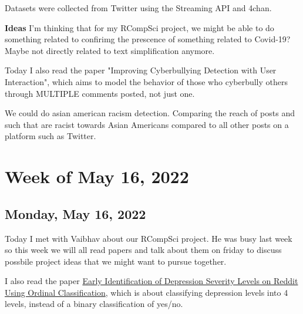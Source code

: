 \documentclass[11pt,letterpaper]{article}
\begin{document}
Datasets were collected from Twitter using the Streaming API and 4chan.

\textbf{Ideas}
I'm thinking that for my RCompSci project, we might be able to do something related to confirimg the prescence of something related to Covid-19? Maybe not directly related to text simplification anymore.

Today I also read the paper "Improving Cyberbullying Detection with User Interaction", which aims to model the behavior of those who cyberbully others through MULTIPLE comments posted, not just one.

We could do asian american racism detection. Comparing the reach of posts and such that are racist towards Asian Americans compared to all other posts on a platform such as Twitter.


\section{Week of May 16, 2022}
\subsection{Monday, May 16, 2022}
Today I met with Vaibhav about our RCompSci project. He was busy last week so this week we will all read papers and talk about them on friday to discuss possbile project ideas that we might want to pursue together.

I also read the paper \href{https://dl.acm.org/doi/pdf/10.1145/3485447.3512128}{Early Identification of Depression Severity Levels on Reddit
Using Ordinal Classification}, which is about classifying depression levels into 4 levels, instead of a binary classification of yes/no.
\end{document}
